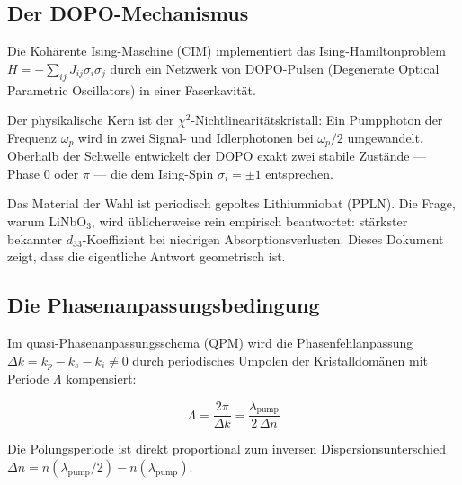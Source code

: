 \subsection{Der DOPO-Mechanismus}

Die Kohärente Ising-Maschine (CIM) implementiert das Ising-Hamiltonproblem
$H = -\sum_{ij} J_{ij}\sigma_i\sigma_j$ durch ein Netzwerk von DOPO-Pulsen
(Degenerate Optical Parametric Oscillators) in einer Faserkavität.

Der physikalische Kern ist der $\chi^2$-Nichtlinearitätskristall: Ein Pumpphoton
der Frequenz $\omega_p$ wird in zwei Signal- und Idlerphotonen bei $\omega_p/2$
umgewandelt. Oberhalb der Schwelle entwickelt der DOPO exakt zwei stabile
Zustände — Phase 0 oder $\pi$ — die dem Ising-Spin $\sigma_i = \pm 1$
entsprechen.

Das Material der Wahl ist periodisch gepoltes Lithiumniobat (PPLN). Die Frage,
warum LiNbO$_3$, wird üblicherweise rein empirisch beantwortet: stärkster
bekannter $d_{33}$-Koeffizient bei niedrigen Absorptionsverlusten.
Dieses Dokument zeigt, dass die eigentliche Antwort geometrisch ist.

\subsection{Die Phasenanpassungsbedingung}

Im quasi-Phasenanpassungsschema (QPM) wird die Phasenfehlanpassung
$\Delta k = k_p - k_s - k_i \neq 0$ durch periodisches Umpolen der
Kristalldomänen mit Periode $\Lambda$ kompensiert:

\begin{equation}
    \Lambda = \frac{2\pi}{\Delta k} = \frac{\lambda_{\text{pump}}}{2\,\Delta n}
    \label{eq:poling}
\end{equation}

Die Polungsperiode ist direkt proportional zum inversen
Dispersionsunterschied $\Delta n = n(\lambda_{\text{pump}}/2) -
n(\lambda_{\text{pump}})$.

\begin{table}[H]
    \centering
    \caption{Typische PPLN-Parameter für LiNbO$_3$ (außerordentliche
    Polarisation, Raumtemperatur, Sellmeier nach Zelmon 1997).}
    \label{tab:ppln}
\end{table}

